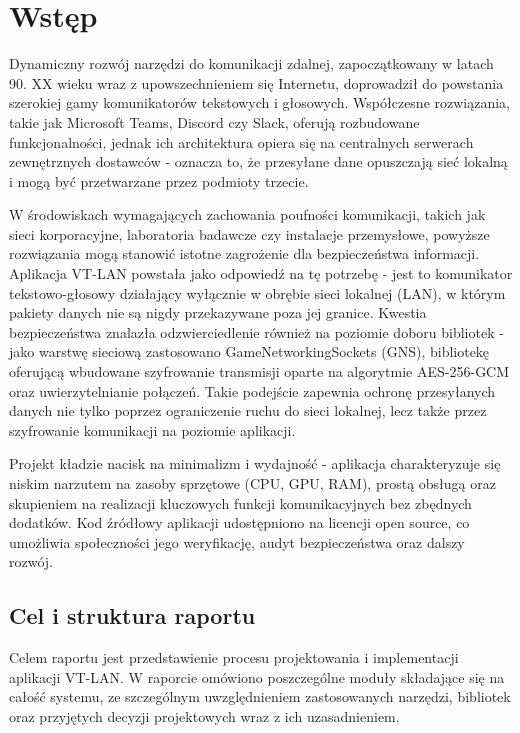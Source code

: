 \chapter{Wstęp}
\label{chapt:Wstep}

Dynamiczny rozwój narzędzi do komunikacji zdalnej, zapoczątkowany w latach 90. XX wieku
wraz z upowszechnieniem się Internetu, doprowadził do powstania szerokiej gamy komunikatorów
tekstowych i głosowych. Współczesne rozwiązania, takie jak Microsoft Teams, Discord czy Slack,
oferują rozbudowane funkcjonalności, jednak ich architektura opiera się na centralnych serwerach
zewnętrznych dostawców - oznacza to, że przesyłane dane opuszczają sieć lokalną i mogą być
przetwarzane przez podmioty trzecie.

W środowiskach wymagających zachowania poufności komunikacji, takich jak sieci korporacyjne,
laboratoria badawcze czy instalacje przemysłowe, powyższe rozwiązania mogą stanowić istotne
zagrożenie dla bezpieczeństwa informacji. Aplikacja VT-LAN powstała jako odpowiedź na tę
potrzebę - jest to komunikator tekstowo-głosowy działający wyłącznie w obrębie sieci lokalnej
(LAN), w którym pakiety danych nie są nigdy przekazywane poza jej granice. Kwestia
bezpieczeństwa znalazła odzwierciedlenie również na poziomie doboru bibliotek - jako
warstwę sieciową zastosowano GameNetworkingSockets (GNS), bibliotekę oferującą wbudowane
szyfrowanie transmisji oparte na algorytmie AES-256-GCM oraz uwierzytelnianie połączeń.
Takie podejście zapewnia ochronę przesyłanych danych nie tylko poprzez ograniczenie ruchu
do sieci lokalnej, lecz także przez szyfrowanie komunikacji na poziomie aplikacji.

Projekt kładzie nacisk na minimalizm i wydajność - aplikacja charakteryzuje się niskim narzutem
na zasoby sprzętowe (CPU, GPU, RAM), prostą obsługą oraz skupieniem na realizacji kluczowych
funkcji komunikacyjnych bez zbędnych dodatków. Kod źródłowy aplikacji udostępniono na licencji
open source, co umożliwia społeczności jego weryfikację, audyt bezpieczeństwa oraz dalszy rozwój.

      
\section{Cel i struktura raportu}
                                       
Celem raportu jest przedstawienie procesu projektowania i implementacji aplikacji
VT-LAN. W raporcie omówiono poszczególne moduły składające się na całość systemu, ze
szczególnym uwzględnieniem zastosowanych narzędzi, bibliotek oraz przyjętych decyzji
projektowych wraz z ich uzasadnieniem.

